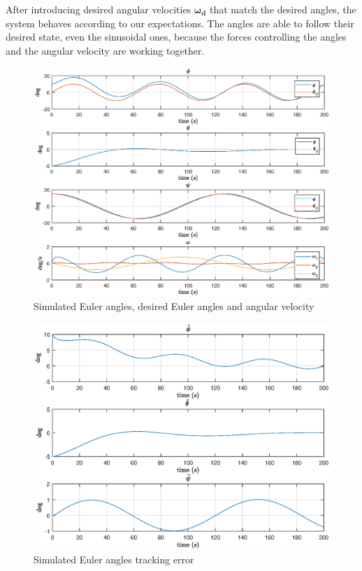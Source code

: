 After introducing desired angular velocities $\boldsymbol{\omega_d}$ that match the desired angles, the system behaves according to our expectations. The angles are able to follow their desired state, even the sinusoidal ones, because the forces controlling the angles and the angular velocity are working together.


\begin{figure}[h!]
    \centering
    \includegraphics[scale=0.6]{eulang3.eps}
    \caption{Simulated Euler angles, desired Euler angles and angular velocity}
    \label{fig:eulang3}
\end{figure}

\begin{figure}[h!]
    \centering
  \includegraphics[scale=0.7]{eulang_tilde3.eps}
  \caption{Simulated Euler angles tracking error}
  \label{fig:eulang_tilde3}
\end{figure}


